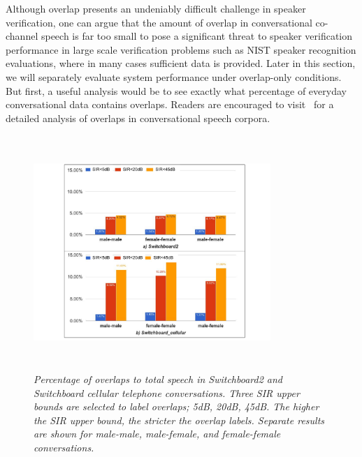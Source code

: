 Although overlap presents an undeniably difficult challenge in speaker verification, one can argue that the amount of overlap in conversational co-channel speech is far too small to pose a significant threat to speaker verification performance in large scale verification problems such as NIST speaker recognition evaluations, where in many cases sufficient data is provided. 
Later in this section, we will separately evaluate system performance under overlap-only conditions. But first, a useful analysis would be to see exactly what percentage of everyday conversational data contains overlaps. 
Readers are encouraged to visit~\cite{shriberg_01} for a detailed analysis of overlaps in conversational speech corpora. 

\begin{figure}[h!]
	\centering
	\vspace{0mm}
	\includegraphics[height = 3.5in, width=0.8\textwidth]{chapters/cochannelplda_jp/IEEEtran/figures/swb_overlap_percentage-crop}
	\vspace{-1mm}
	\caption{\it \small Percentage of overlaps to total speech in Switchboard2 and Switchboard cellular telephone conversations. Three SIR upper bounds are selected to label overlaps; 5dB, 20dB, 45dB. The higher the SIR upper bound, the stricter the overlap labels. Separate results are shown for male-male, male-female, and female-female conversations.}
	\label{fig:swb_overlap_percentage}
	\vspace{-3mm}
\end{figure}

